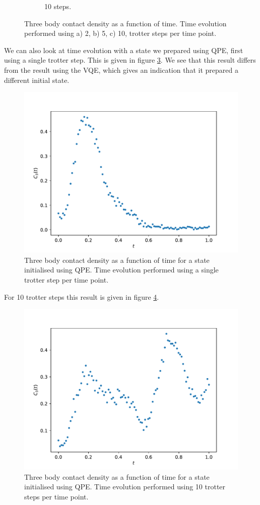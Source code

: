 \documentclass[10 pt, a4paper]{article}
\begin{document}
\begin{figure}[H]
\begin{subfigure}{.32\textwidth}
  \caption{10 steps.}
  \label{fig:sub3}
\end{subfigure}
\caption{Three body contact density as a function of time. Time evolution performed using a) 2, b) 5, c) 10, trotter steps per time point.} \label{fig:tbc2}
\end{figure}

We can also look at time evolution with a state we prepared using QPE, first using a single trotter step. This is given in figure \ref{fig:qpetbc1}.
We see that this result differs from the result using the VQE, which gives an indication that it prepared a different initial state.
\begin{figure}[H]
\centering
	\includegraphics[width=0.7\linewidth]{QPEtbc1}
\caption{Three body contact density as a function of time for a state initialised using QPE. Time evolution performed using a single trotter step per time point. } \label{fig:qpetbc1}
\end{figure}

For 10 trotter steps this result is given in figure \ref{fig:qpetbc10}. 

\begin{figure}[H]
\centering
	\includegraphics[width=0.7\linewidth]{QPEtbc10}
\caption{Three body contact density as a function of time for a state initialised using QPE. Time evolution performed using 10 trotter steps per time point.}  \label{fig:qpetbc10}
\end{figure}
\end{document}
